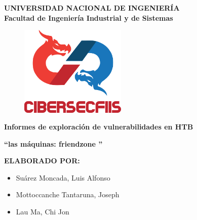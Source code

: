 \begin{titlepage}
	
	
	\begin{center}
		{\LARGE \textbf{UNIVERSIDAD NACIONAL DE INGENIERÍA}}\\
		\vspace{5 mm}
		{\large \textbf{Facultad de Ingeniería Industrial y de Sistemas}}\\
		\vspace{15.5 mm}
		\begin{figure}[h]
			\centering 
			\includegraphics[width=0.45\textwidth]{images/CiberSecFIIS.png}
		\end{figure}
		\vspace{4 mm}	
		{\Large \textbf{Informes de exploración de vulnerabilidades en HTB} }\\
		\vspace{5 mm}
		
		\onehalfspacing  %
		{\Large \textbf{``{\@De las máquinas: friendzone }''} }\\
		
		\singlespacing  %
		
		\vspace{4 mm}	

		\vspace{20 mm}
		{\large \textbf{ELABORADO POR:} }\\
		\vspace{10 mm}
		\begin{center}
			\begin{minipage}{0.7\textwidth}
			  \begin{itemize}
				\item \Large Suárez Moncada, Luis Alfonso
				\item \Large Mottoccanche Tantaruna, Joseph
				\item \Large Lau Ma, Chi Jon
			  \end{itemize}
			\end{minipage}
		  \end{center}

		\vspace{5 mm}	
	\end{center}

\end{titlepage}
